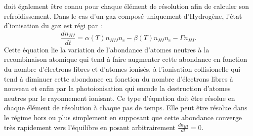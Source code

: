  doit également être connu pour chaque élément de résolution afin de calculer son refroidissement. Dans le cas d'un gaz composé uniquement d'Hydrogène, l'état d'ionisation du gaz est régi par :
\begin{equation}
\frac{dn_{HI}}{dt}=\alpha(T) n_{HII} n_e-\beta(T) n_{HI}n_e-\Gamma n_{HI}.
\label{e:eint}
\end{equation}
Cette équation lie la variation de l'abondance d'atomes neutres à la recombinaison atomique  qui tend à faire augmenter cette abondance en fonction du nombre d'électrons libres et d'atomes ionisés, à l'ionisation collisionelle  qui tend à diminuer cette abondance en fonction du nombre d'électrons libres à nouveau et enfin par la photoionisation  qui encode la destruction d'atomes neutres par le rayonnement ionisant. Ce type d'équation doit être résolue en chaque élément de résolution à chaque pas de temps. Elle peut être résolue dans le régime hors  ou plus simplement en supposant que cette abondance converge très rapidement vers l'équilibre en posant arbitrairement $\frac{dn_{HI}}{dt}=0$.

